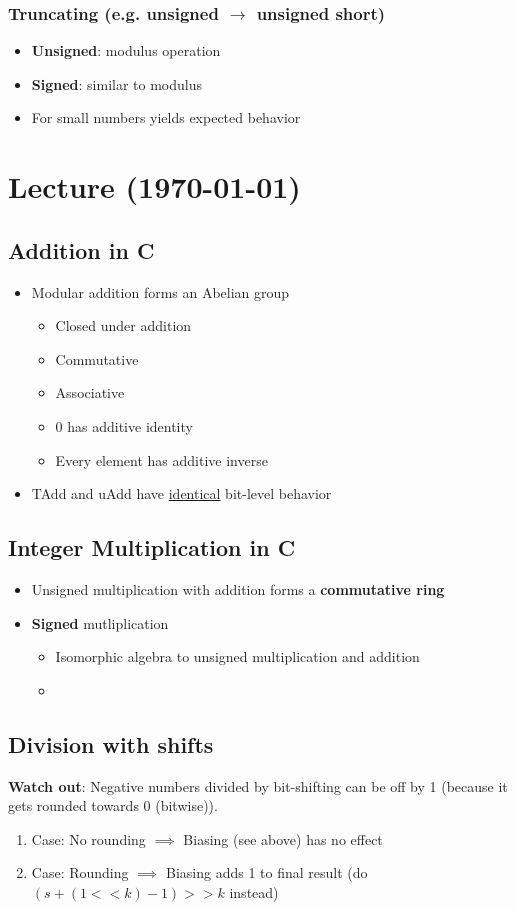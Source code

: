 \documentclass[a4paper,10pt]{article}
\begin{document}
\subsubsection{Truncating (e.g. unsigned $\rightarrow$ unsigned short)}
\begin{itemize}
    \item \textbf{Unsigned}: modulus operation
    \item \textbf{Signed}: similar to modulus
    \item For small numbers yields expected behavior
\end{itemize}
\section{Lecture (\today)}
\subsection{Addition in C}
\begin{itemize}
    \item Modular addition forms an Abelian group
    \begin{itemize}
        \item Closed under addition
        \item Commutative
        \item Associative
        \item 0 has additive identity 
        \item Every element has additive inverse
    \end{itemize}
    \item  TAdd and uAdd have \underline{identical} bit-level behavior
\end{itemize}
\subsection{Integer Multiplication in C}
\begin{itemize}
    \item Unsigned multiplication with addition forms a \textbf{commutative ring}
    \item \textbf{Signed} mutliplication
    \begin{itemize}
        \item Isomorphic algebra to unsigned multiplication and addition
        \item 
    \end{itemize}
\end{itemize}
\subsection{Division with shifts}
\textbf{Watch out}: Negative numbers divided by bit-shifting can be off by 1 (because it gets rounded towards 0 (bitwise)). 
\begin{enumerate}
    \item Case: No rounding $\implies$ Biasing (see above) has no effect
    \item Case: Rounding $\implies$ Biasing adds 1 to final result (do $(s + (1<<k)-1) >> k$ instead)
\end{enumerate}
\end{document}
